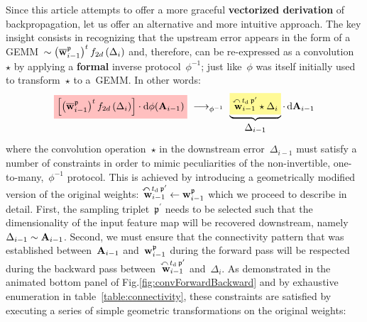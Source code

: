 \documentclass{article}
\newcommand{\mathcolorbox}[2]{\colorbox{#1}{$\displaystyle #2$}}
\begin{document}
\newpage

\noindent Since this article attempts to offer a more graceful \hypertarget{convTransf}{{\bf vectorized derivation}} of backpropagation, let us offer an alternative and more intuitive approach.  The key insight consists in recognizing that the upstream error appears in the form of a GEMM~$\sim \left( \overline{\bf w}^\mathfrak{p}_{i-1} \right)^t f_{2d} \left( \Delta_i \right)$ and, therefore, can be re-expressed as a convolution~$\star$ by applying a {\bf formal} inverse protocol~$\phi^{-1}$; just like~$\phi$ was itself initially used to transform~$\star$ to a~GEMM.  In other words:
\begin{equation}
\mathcolorbox{pink}{ \left[ \left( \overline{\bf w}^\mathfrak{p}_{i-1} \right)^t f_{2d} \left( \Delta_i \right) \right] \cdot \text{d} \phi({\bf A}_{i-1}) } \,\, \longrightarrow_{\phi^{-1}} \,\, \underbrace{ \mathcolorbox{shadecolor}{ \overset{\curvearrowleft \, t_{\text{d}} \, \mathfrak{p^\prime} }{{\bf w}_{i-1}} \star \Delta_i }}_{\textstyle
    \begin{gathered}
      \Delta_{i-1}
    \end{gathered} } \cdot \, \text{d} {\bf A}_{i-1}
\label{eq:backAsConv}
\end{equation}
where the convolution operation~$\star$ in the downstream error~$\Delta_{i-1}$ must satisfy a number of constraints in order to mimic peculiarities of the non-invertible, one-to-many,~$\phi^{-1}$ protocol.  This is achieved by introducing a geometrically modified version of the original weights:  $\overset{\curvearrowleft \, t_{\text{d}} \, \mathfrak{p^\prime} }{{\bf w}_{i-1}} \leftarrow {\bf w}^\mathfrak{p}_{i-1}$ which we proceed to describe in detail.  First, the sampling triplet~$\mathfrak{p}^\prime$ needs to be selected such that the dimensionality of the input feature map will be recovered downstream, namely~$\Delta_{i-1} \sim {\bf A}_{i-1}$.  Second, we must ensure that the connectivity pattern that was established between~${\bf A}_{i-1}$ and~${\bf w}^\mathfrak{p}_{i-1}$ during the forward pass will be respected during the backward pass between~$\overset{\curvearrowleft \, t_{\text{d}} \, \mathfrak{p^\prime} }{{\bf w}_{i-1}}$ and~$\Delta_i$.  As demonstrated in the animated bottom panel of Fig.\ref{fig:convForwardBackward} and by exhaustive enumeration in table~\ref{table:connectivity}, these constraints are satisfied by executing a series of simple geometric transformations on the original weights:
\end{document}
